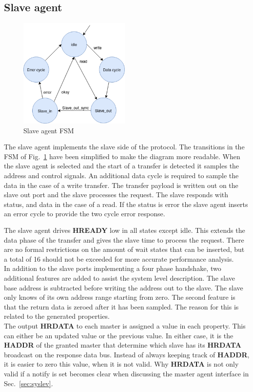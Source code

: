 \subsection{Slave agent}
\begin{figure}
\includegraphics[width=5.5cm]{figs/hw/sAgent_FSM.png}
\caption{Slave agent FSM}\label{fig:rsfsm}
\end{figure}  

The slave agent implements the slave side of the protocol. The transitions in the FSM of Fig.~\ref{fig:rsfsm} have been simplified to make the diagram more readable. When the slave agent is selected and the start of a transfer is detected it samples the address and control signals. An additional data cycle is
required to sample the data in the case of a write transfer. The transfer payload is written out on the slave out port and the slave processes the request. The slave responds with status, and data in the case of a read. If the status is error the slave agent inserts an error cycle to provide the two cycle error response. \par
The slave agent drives \textbf{HREADY} low in all states except idle. This extends the data phase of the transfer and gives the slave time to process the request. There are no formal restrictions on the amount of wait states that can be inserted, but a total of 16 should not be exceeded for more accurate performance analysis. \\
In addition to the slave ports implementing a four phase handshake, two additional features are added to assist the system level description. The slave base address is subtracted before writing the address out to the slave. The slave only knows of its own address range starting from zero. The second feature is that the return data is zeroed after it has been sampled. The reason for this is related to the generated properties. \\
The output \textbf{HRDATA} to each master is assigned a value in each property. This can either be an updated value or the previous value. In either case, it is the \textbf{HADDR} of the granted master that determine which slave has its \textbf{HRDATA} broadcast on the response data bus. Instead of always keeping track of \textbf{HADDR}, it is easier to zero this value, when it is not valid. Why \textbf{HRDATA} is not only valid if a notify is set becomes clear when discussing the master agent interface in Sec.~\ref{sec:syslev}.   
\newpage

